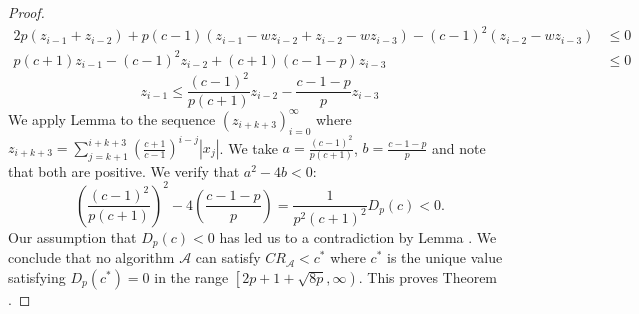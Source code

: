 \begin{appendixonly}
\begin{proof}
\begin{align*}
    2p\left(z_{i-1} + z_{i-2}\right) + p(c-1)\left(z_{i-1}-wz_{i-2}+z_{i-2}-wz_{i-3}\right) - (c-1)^2\left(z_{i-2}-wz_{i-3}\right) &\leq 0 \\
    p(c+1)z_{i-1} - (c-1)^2z_{i-2} + (c+1)\left(c-1-p\right)z_{i-3} &\leq 0
  \end{align*}
  \begin{equation*}
    z_{i-1} \leq \frac{(c-1)^2}{p(c+1)}z_{i-2} - \frac{c-1-p}{p}z_{i-3}
  \end{equation*}
  We apply Lemma  to the sequence $\left(z_{i+k+3}\right)_{i=0}^{\infty}$ where $z_{i+k+3} = \sum_{j=k+1}^{i+k+3}\left(\frac{c+1}{c-1}\right)^{i-j}|x_j|$. We take $a=\frac{(c-1)^2}{p(c+1)}$, $b=\frac{c-1-p}{p}$ and note that both are positive. We verify that $a^2-4b<0$:
  \begin{equation*}
    \left(\frac{(c-1)^2}{p(c+1)}\right)^2 - 4\left(\frac{c-1-p}{p}\right) = \frac{1}{p^2(c+1)^2}D_p(c) < 0 .
  \end{equation*}
  Our assumption that $D_p(c) < 0$ has led us to a contradiction by Lemma . We conclude that no algorithm $\mathcal{A}$ can satisfy $CR_{\mathcal{A}}<c^*$ where $c^*$ is the unique value satisfying $D_p(c^*)=0$ in the range $\left[2p+1+\sqrt{8p},\infty\right)$. This proves Theorem .
\end{proof}
\end{appendixonly}

